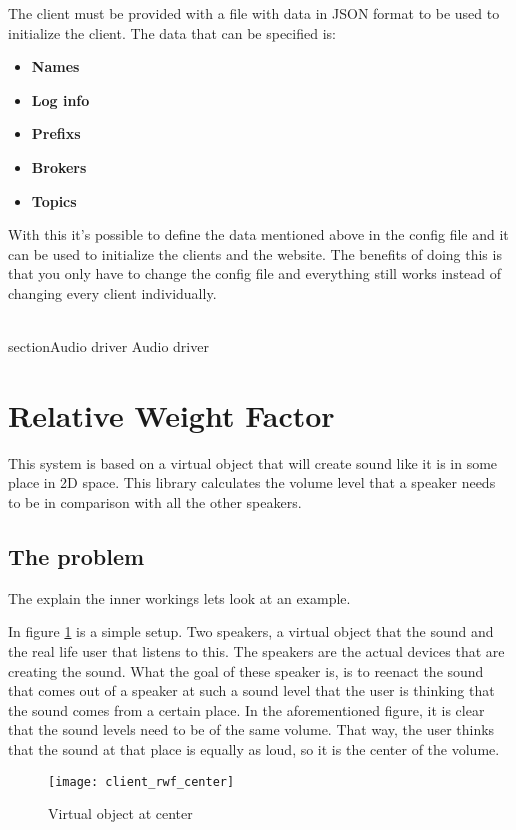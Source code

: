 The client must be provided with a file with data in JSON format to be used to initialize the client. The data that can be specified is:
\small{
\begin{itemize} [noitemsep, nolistsep]
	\item \textbf {Names}
	\item \textbf {Log info}
	\item \textbf {Prefixs}
	\item \textbf {Brokers}
	\item \textbf {Topics\\}
\end{itemize}
}
With this it's possible to define the data mentioned above in the config file and it can be used to initialize the clients and the website. The benefits of doing this is that you only have to change the config file and everything still works instead of changing every client individually.

\\section{Audio driver}
\label{sec:client_audio_driver}
Audio driver

\section{Relative Weight Factor}
\label{sec:client_relative_weight_factor}

This system is based on a virtual object that will create sound like it is in some place in 2D space.
This library calculates the volume level that a speaker needs to be in comparison with all the other speakers.

\subsection{The problem}
\label{sub:client_rwf_the_problem}

The explain the inner workings lets look at an example.

In figure \ref{fig:client_rwf_center} is a simple setup. Two speakers, a virtual object that  the sound and the real life user that listens to this.
The speakers are the actual devices that are creating the sound.
What the goal of these speaker is, is to reenact the sound that comes out of a speaker at such a sound level that the user is thinking that the sound comes from a certain place.
In the aforementioned figure, it is clear that the sound levels need to be of the same volume.
That way, the user thinks that the sound at that place is equally as loud, so it is the center of the volume.
\begin{figure}[H]
    \centering
    \texttt{[image: client\_rwf\_center]}
    \caption{Virtual object at center}
    \label{fig:client_rwf_center}
\end{figure}

